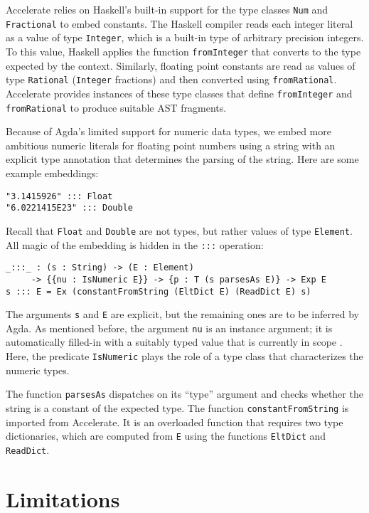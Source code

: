 \documentclass{llncs}
\begin{document}
Accelerate relies on Haskell's built-in support for the type classes
\texttt{Num} and \texttt{Fractional} to embed constants. The Haskell
compiler reads each integer literal as a value of type
\texttt{Integer}, which is a built-in type of arbitrary precision
integers. To this value, Haskell applies the function
\texttt{fromInteger} that converts to the type expected by the
context. Similarly, floating point constants are read as values of
type \texttt{Rational} (\texttt{Integer} fractions) and then converted
using \texttt{fromRational}. Accelerate provides instances of these
type classes that define \texttt{fromInteger} and
\texttt{fromRational} to produce suitable AST fragments.

Because of Agda's limited support for numeric data types,
we embed more ambitious numeric literals for floating point numbers
using a string with an explicit type annotation that determines the
parsing of the string. Here are some example embeddings:
\begin{verbatim}
"3.1415926" ::: Float
"6.0221415E23" ::: Double
\end{verbatim}
Recall that \texttt{Float} and \texttt{Double} are not
types, but rather values of type \texttt{Element}.
All magic of the embedding is hidden in the \texttt{:::} operation:
\begin{verbatim}
_:::_ : (s : String) -> (E : Element) 
     -> {{nu : IsNumeric E}} -> {p : T (s parsesAs E)} -> Exp E
s ::: E = Ex (constantFromString (EltDict E) (ReadDict E) s)
\end{verbatim}
The arguments \texttt{s} and \texttt{E} are explicit, but the
remaining ones are to be inferred by Agda.
As mentioned before, the argument \texttt{nu} is an instance argument; it is automatically
filled-in with a suitably typed value that is currently in scope
\cite{DevriesePiessens2011}. Here, the predicate 
\texttt{IsNumeric} plays the role of a type class that characterizes
the numeric types.

The function \texttt{parsesAs} dispatches on its ``type'' argument and
checks whether the string is a constant of the expected type. The
function \texttt{constantFromString} is imported from Accelerate.
It is an overloaded function that requires two type dictionaries,
which are computed from \texttt{E} using the functions \texttt{EltDict}
and \texttt{ReadDict}. 

\section{Limitations}
\label{sec:limitations}
\end{document}
